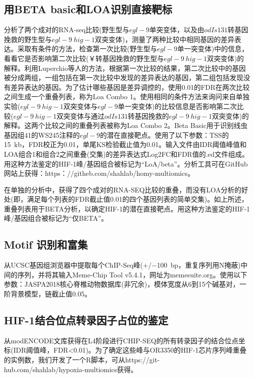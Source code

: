 \documentclass{ctexart}
\begin{document}
        \subsection{用BETA basic和LOA识别直接靶标}

        分析了两个成对的RNA-seq比较(野生型与$egl-9$单突变体，以及由$odIs131$转基因挽救的野生型与$egl-9~hig-1$双突变体)，测量了两种比较中相同基因的差异表达。采取有条件的方法，检查第一次比较(野生型与$egl-9$单一突变体)中的信息，看看它是否影响第二次比较(￥转基因挽救的野生型与$egl-9~hig-1$双突变体)的解释。利用Luperchio等人的方法，根据第一次比较的结果，第二次比较中的基因被分成两组，一组包括在第一次比较中发现的差异表达的基因，第二组包括发现没有差异表达的基因。为了估计哪些基因是差异调控的，使用0.01的FDR在两次比较之间生成一个重叠列表，称为Loa Combo 1。使用相同的条件方法来询问来自单独实验($egl-9~hig-1$双突变体与$egl-9$单一突变体)的比较信息是否影响第二次比较($egl-9~hig-1$双突变体与通过$odIs131$转基因挽救的$egl-9~hig-1$双突变体)的解释。这两个比较之间的重叠列表被称为Loa Combo 2。Beta Basic用于识别线虫基因组41的WS245注释的$egl-9$的潜在直接靶点。使用了以下参数：TSS的15~kb，FDR校正为0.01，单尾KS检验截止值为0.01。输入文件由IDR阈值峰值和LOA组合1和组合2之间重叠(交集)的差异表达式Log2FC和FDR值的.ed文件组成。用这种方法鉴定的HIF-1峰/基因组合被标记为“LoA/beta”。分析工具可在GitHub网站上获得：https：//githeb.com/shahlab/homy-multiomics。

        在单独的分析中，获得了四个成对的RNA-SEQ比较的重叠，而没有LOA分析的好处(即，满足每个列表的FDR截止值0.01的四个基因列表的简单交集)。如上所述，重叠列表用于BETA分析，以确定HIF-1的潜在直接靶点。用这种方法鉴定的HIF-1峰/基因组合被标记为“仅BETA”。

        \subsection{Motif 识别和富集}

        从UCSC基因组浏览器中提取每个ChIP-Seq峰(+/−100~bp，重复序列用N掩蔽)中间的序列，并将其输入Meme-Chip Tool v5.4.1，网址为memesuite.org。使用以下参数：JASPA2018核心脊椎动物数据库(非冗余)，模体宽度从6到15个碱基对，一阶背景模型，链截止值0.05。

        \subsection{HIF-1结合位点转录因子占位的鉴定}

        从modENCODE文库获得在L4阶段进行CHIP-SEQ的所有转录因子的结合位点坐标(IDR阈值峰，FDR<0.01)。为了确定这些峰与OR3350的HIF-1芯片序列峰重叠的实例数，我们开发了一个R脚本，可从https://git-\\hub.com/shahlab/hypoxia-multiomics获得。
\end{document}
